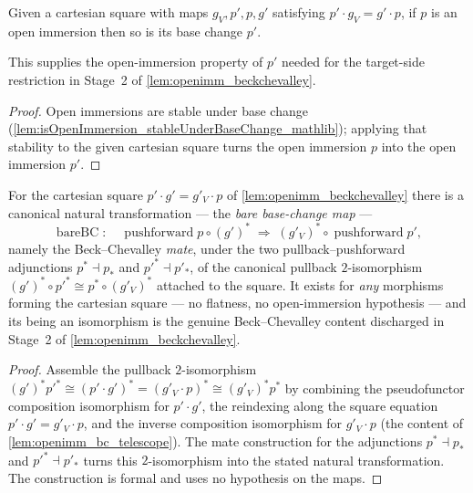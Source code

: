 \begin{lemma}
  \label{lem:isOpenImmersion_of_isPullback_left}
  Given a cartesian square with maps \(g_V, p', p, g'\) satisfying \(p' \cdot g_V = g'
  \cdot p\), if \(p\) is an open immersion then so is its base change \(p'\).

  This supplies the open-immersion property of \(p'\) needed for the target-side restriction in
  Stage~2 of \cref{lem:openimm_beckchevalley}.
\end{lemma}
\begin{proof}
  Open immersions are stable under base change
  (\cref{lem:isOpenImmersion_stableUnderBaseChange_mathlib}); applying that stability to the given
  cartesian square turns the open immersion \(p\) into the open immersion \(p'\).
\end{proof}

\begin{lemma}\leanok
  \label{lem:openimm_bareBC}
  For the cartesian square \(p' \cdot g' = g'_V \cdot p\) of \cref{lem:openimm_beckchevalley} there
  is a canonical natural transformation --- the \emph{bare base-change map} ---
  \[
    \operatorname{bareBC} \colon\quad
    \operatorname{pushforward} p \circ (g')^*
      \;\Longrightarrow\;
    (g'_V)^* \circ \operatorname{pushforward} p',
  \]
  namely the Beck--Chevalley \emph{mate}, under the two pullback--pushforward adjunctions
  \(p^* \dashv p_*\) and \(p'^* \dashv p'_*\), of the canonical pullback \(2\)-isomorphism
  \((g')^* \circ p'^* \cong p^* \circ (g'_V)^*\) attached to the square. It exists for \emph{any}
  morphisms forming the cartesian square --- no flatness, no open-immersion hypothesis --- and its
  being an isomorphism is the genuine Beck--Chevalley content discharged in Stage~2 of
  \cref{lem:openimm_beckchevalley}.
\end{lemma}
\begin{proof}
  Assemble the pullback \(2\)-isomorphism
  \((g')^* p'^* \cong (p' \cdot g')^* = (g'_V \cdot p)^* \cong (g'_V)^* p^*\) by combining
  the pseudofunctor composition isomorphism for \(p' \cdot g'\), the reindexing along the square
  equation \(p' \cdot g' = g'_V \cdot p\), and the inverse composition isomorphism for
  \(g'_V \cdot p\) (the content of \cref{lem:openimm_bc_telescope}). The mate construction for the adjunctions \(p^* \dashv p_*\) and
  \(p'^* \dashv p'_*\) turns this \(2\)-isomorphism into the stated natural transformation. The
  construction is formal and uses no hypothesis on the maps.
\end{proof}

